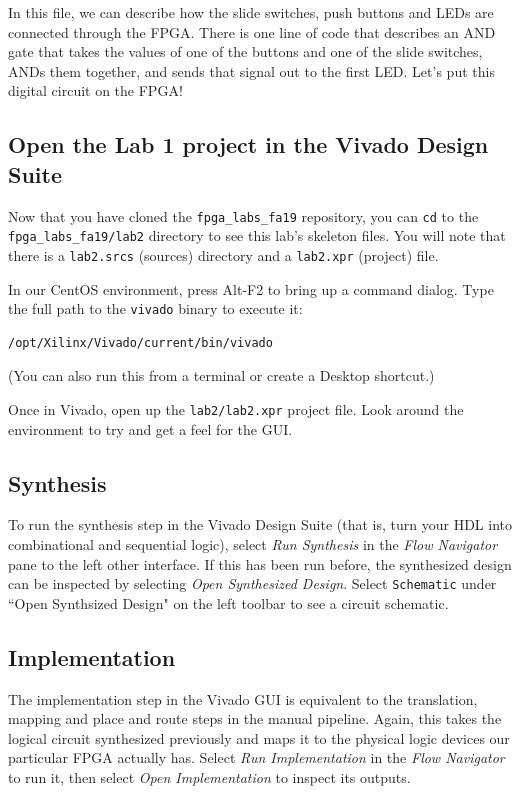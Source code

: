 \documentclass[11pt]{article}
\newcommand{\repo}{fpga\_labs\_fa19}
\begin{document}
In this file, we can describe how the slide switches, push buttons and LEDs are connected through the FPGA. There is one line of code that describes an AND gate that takes the values of one of the buttons and one of the slide switches, ANDs them together, and sends that signal out to the first LED. Let's put this digital circuit on the FPGA!


\subsection{Open the Lab 1 project in the Vivado Design Suite}
Now that you have cloned the \texttt{\repo} repository, you can \texttt{cd} to the \texttt{\repo/lab2} directory to see this lab's skeleton files.
You will note that there is a \verb|lab2.srcs| (sources) directory and a \verb|lab2.xpr| (project) file.

In our CentOS environment, press Alt-F2 to bring up a command dialog. Type the full path to the \texttt{vivado} binary to execute it:

\begin{verbatim}
/opt/Xilinx/Vivado/current/bin/vivado
\end{verbatim}

(You can also run this from a terminal or create a Desktop shortcut.)

Once in Vivado, open up the \texttt{lab2/lab2.xpr} project file. Look around the environment to try and get a feel for the GUI.

\subsection{Synthesis}
To run the synthesis step in the Vivado Design Suite (that is, turn your HDL into combinational and sequential logic), select \emph{Run Synthesis} in the \emph{Flow Navigator} pane to the left other interface. If this has been run before, the synthesized design can be inspected by selecting \emph{Open Synthesized Design}. Select \texttt{Schematic} under ``Open Synthsized Design" on the left toolbar to see a circuit schematic.

\subsection{Implementation}
The implementation step in the Vivado GUI is equivalent to the translation, mapping and place and route steps in the manual pipeline. Again, this takes the logical circuit synthesized previously and maps it to the physical logic devices our particular FPGA actually has. Select \emph{Run Implementation} in the \emph{Flow Navigator} to run it, then select \emph{Open Implementation} to inspect its outputs.
\end{document}
